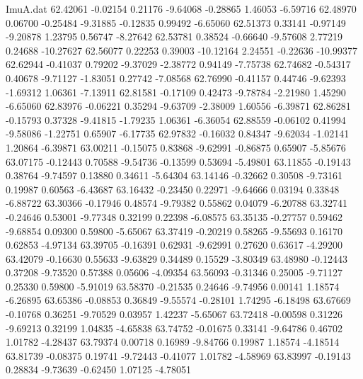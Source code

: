 \begin{filecontents}{ImuA.dat}
  62.42061   -0.02154    0.21176   -9.64068   -0.28865    1.46053   -6.59716
  62.48970    0.06700   -0.25484   -9.31885   -0.12835    0.99492   -6.65060
  62.51373    0.33141   -0.97149   -9.20878    1.23795    0.56747   -8.27642
  62.53781    0.38524   -0.66640   -9.57608    2.77219    0.24688  -10.27627
  62.56077    0.22253    0.39003  -10.12164    2.24551   -0.22636  -10.99377
  62.62944   -0.41037    0.79202   -9.37029   -2.38772    0.94149   -7.75738
  62.74682   -0.54317    0.40678   -9.71127   -1.83051    0.27742   -7.08568
  62.76990   -0.41157    0.44746   -9.62393   -1.69312    1.06361   -7.13911
  62.81581   -0.17109    0.42473   -9.78784   -2.21980    1.45290   -6.65060
  62.83976   -0.06221    0.35294   -9.63709   -2.38009    1.60556   -6.39871
  62.86281   -0.15793    0.37328   -9.41815   -1.79235    1.06361   -6.36054
  62.88559   -0.06102    0.41994   -9.58086   -1.22751    0.65907   -6.17735
  62.97832   -0.16032    0.84347   -9.62034   -1.02141    1.20864   -6.39871
  63.00211   -0.15075    0.83868   -9.62991   -0.86875    0.65907   -5.85676
  63.07175   -0.12443    0.70588   -9.54736   -0.13599    0.53694   -5.49801
  63.11855   -0.19143    0.38764   -9.74597    0.13880    0.34611   -5.64304
  63.14146   -0.32662    0.30508   -9.73161    0.19987    0.60563   -6.43687
  63.16432   -0.23450    0.22971   -9.64666    0.03194    0.33848   -6.88722
  63.30366   -0.17946    0.48574   -9.79382    0.55862    0.04079   -6.20788
  63.32741   -0.24646    0.53001   -9.77348    0.32199    0.22398   -6.08575
  63.35135   -0.27757    0.59462   -9.68854    0.09300    0.59800   -5.65067
  63.37419   -0.20219    0.58265   -9.55693    0.16170    0.62853   -4.97134
  63.39705   -0.16391    0.62931   -9.62991    0.27620    0.63617   -4.29200
  63.42079   -0.16630    0.55633   -9.63829    0.34489    0.15529   -3.80349
  63.48980   -0.12443    0.37208   -9.73520    0.57388    0.05606   -4.09354
  63.56093   -0.31346    0.25005   -9.71127    0.25330    0.59800   -5.91019
  63.58370   -0.21535    0.24646   -9.74956    0.00141    1.18574   -6.26895
  63.65386   -0.08853    0.36849   -9.55574   -0.28101    1.74295   -6.18498
  63.67669   -0.10768    0.36251   -9.70529    0.03957    1.42237   -5.65067
  63.72418   -0.00598    0.31226   -9.69213    0.32199    1.04835   -4.65838
  63.74752   -0.01675    0.33141   -9.64786    0.46702    1.01782   -4.28437
  63.79374    0.00718    0.16989   -9.84766    0.19987    1.18574   -4.18514
  63.81739   -0.08375    0.19741   -9.72443   -0.41077    1.01782   -4.58969
  63.83997   -0.19143    0.28834   -9.73639   -0.62450    1.07125   -4.78051

\end{filecontents}
